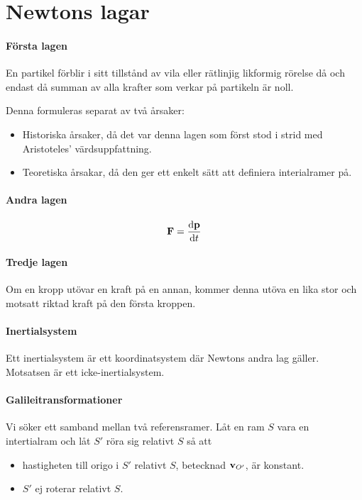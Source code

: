 \section{Newtons lagar}

\paragraph{Första lagen}
En partikel förblir i sitt tillstånd av vila eller rätlinjig likformig rörelse då och endast då summan av alla krafter som verkar på partikeln är noll.

Denna formuleras separat av två årsaker:
\begin{itemize}
	\item Historiska årsaker, då det var denna lagen som först stod i strid med Aristoteles' värdsuppfattning.
	\item Teoretiska årsakar, då den ger ett enkelt sätt att definiera interialramer på.
\end{itemize}

\paragraph{Andra lagen}
\begin{align*}
	\vect{F} = \dv{\vect{p}}{t}
\end{align*}

\paragraph{Tredje lagen}
Om en kropp utövar en kraft på en annan, kommer denna utöva en lika stor och motsatt riktad kraft på den första kroppen.

\paragraph{Inertialsystem}
Ett inertialsystem är ett koordinatsystem där Newtons andra lag gäller. Motsatsen är ett icke-inertialsystem.

\paragraph{Galileitransformationer}
Vi söker ett samband mellan två referensramer. Låt en ram $S$ vara en intertialram och låt $S'$ röra sig relativt $S$ så att
\begin{itemize}
	\item hastigheten till origo i $S'$ relativt $S$, betecknad $\vb{v}_{O'}$, är konstant.
	\item $S'$ ej roterar relativt $S$.
\end{itemize}

